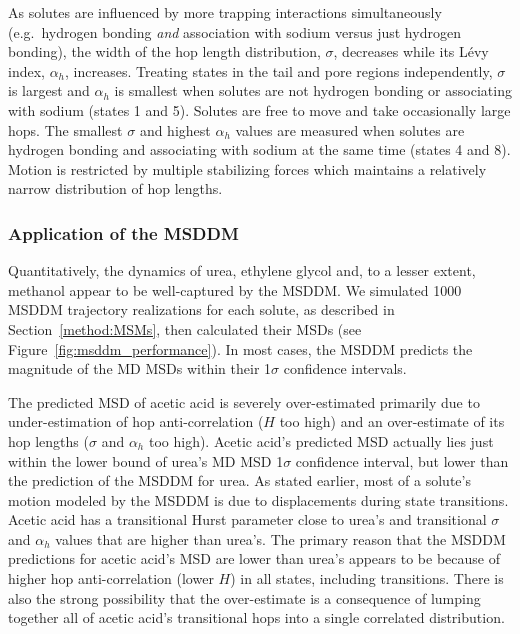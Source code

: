 \documentclass[aps,pre,preprint,groupedaddress,longbibliography]{revtex4-2}
\begin{document}
  As solutes are influenced by more trapping interactions simultaneously
  (e.g.~hydrogen bonding \textit{and} association with sodium versus just
  hydrogen bonding), the width of the hop length distribution, $\sigma$,
  decreases while its L\'evy index, $\alpha_h$, increases. Treating states in
  the tail and pore regions independently, $\sigma$ is largest and $\alpha_h$
  is smallest when solutes are not hydrogen bonding or associating with sodium
  (states 1 and 5). Solutes are free to move and take occasionally large hops.
  The smallest $\sigma$ and highest $\alpha_h$ values are measured when solutes
  are hydrogen bonding and associating with sodium at the same time (states 4
  and 8). Motion is restricted by multiple stabilizing forces which maintains a
  relatively narrow distribution of hop lengths.
  
  \subsubsection{Application of the MSDDM}\label{section:msddm_application}
  
  Quantitatively, the dynamics of urea, ethylene glycol and, to a lesser extent, 
  methanol appear to be well-captured by the MSDDM. We simulated 1000 MSDDM trajectory realizations
  for each solute, as described in Section~\ref{method:MSMs}, then calculated their
  MSDs (see Figure~\ref{fig:msddm_performance}). In most cases, the MSDDM predicts
  the magnitude of the MD MSDs within their 1$\sigma$ confidence intervals. 
 
  The predicted MSD of acetic acid is severely over-estimated primarily due to
  under-estimation of hop anti-correlation ($H$ too high) and an over-estimate
  of its hop lengths ($\sigma$ and $\alpha_h$ too high). Acetic acid's
  predicted MSD actually lies just within the lower bound of urea's MD MSD
  1$\sigma$ confidence interval, but lower than the prediction of the MSDDM for
  urea. As stated earlier, most of a solute’s motion modeled by the MSDDM is
  due to displacements during state transitions. Acetic acid has a transitional
  Hurst parameter close to urea’s and transitional $\sigma$ and $\alpha_h$
  values that are higher than urea’s. The primary reason that the MSDDM
  predictions for acetic acid's MSD are lower than urea's appears to be because
  of higher hop anti-correlation (lower $H$) in all states, including
  transitions. There is also the strong possibility that the over-estimate is
  a consequence of lumping together all of acetic acid’s transitional hops into
  a single correlated distribution.
\end{document}
